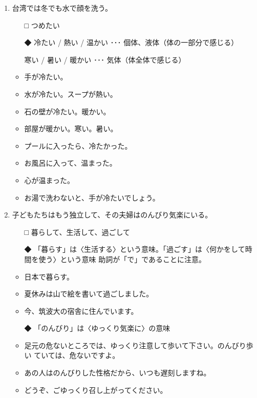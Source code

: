 \documentclass[
uplatex,
b5paper,
10pt,
dvipdfmx
]{jsbook}
\begin{document}
\begin{enumerate}
\item 台湾では冬でも\underline{\hspace{3zw}}水で顔を洗う。
\begin{itemize}
\item[□] つめたい
\item[◆] 冷たい / 熱い / 温かい ･･･ 個体、液体（体の一部分で感じる）

	  寒い / 暑い / 暖かい ･･･ 気体（体全体で感じる）

\end{itemize}
\begin{itemize}
\item 手が冷たい。
\item 水が冷たい。スープが熱い。
\item 石の壁が冷たい。暖かい。
\item 部屋が暖かい。寒い。暑い。
\item プールに入ったら、冷たかった。
\item お風呂に入って、温まった。
\item 心が温まった。
\item お湯で洗わないと、手が冷たいでしょう。
\end{itemize}

\item 子どもたちはもう独立して、その夫婦はのんびり気楽に\underline{\hspace{3zw}}いる。
\begin{itemize}
\item[□] 暮らして、生活して、過ごして
\item[◆] 「暮らす」は〈生活する〉という意味。「過ごす」は〈何かをして時
	  間を使う〉という意味 助詞が「で」であることに注意。
\end{itemize}
\begin{itemize}
\item 日本で暮らす。
\item 夏休みは山で絵を書いて過ごしました。
\item 今、筑波大の宿舎に住んでいます。
\end{itemize}
\begin{itemize}
\item[◆] 「のんびり」は〈ゆっくり気楽に〉の意味
\end{itemize}
\begin{itemize}
\item 足元の危ないところでは、ゆっくり注意して歩いて下さい。のんびり歩い
      ていては、危ないですよ。
\item あの人はのんびりした性格だから、いつも遅刻しますね。
\item どうぞ、ごゆっくり召し上がってください。
\end{itemize}


\end{enumerate}
\end{document}
